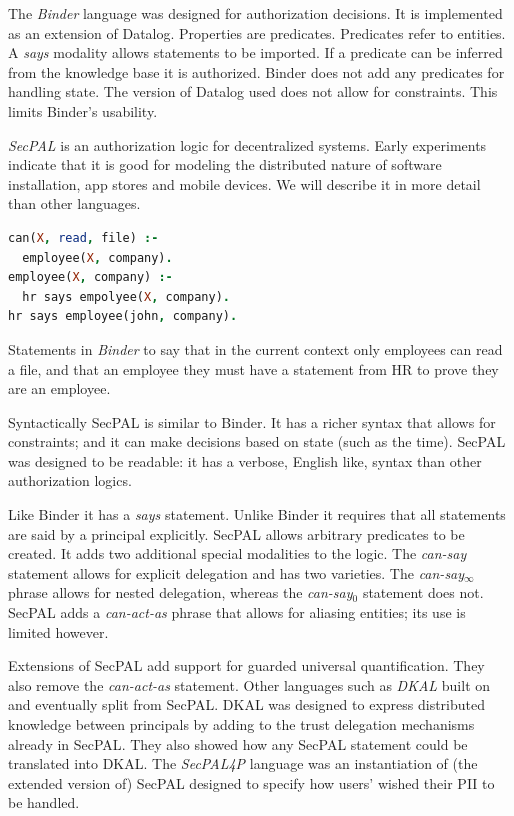 \documentclass[a4paper,sfsidenotes]{tufte-book}
\begin{document}
The \emph{Binder} language\cite{DeTreville:2002ff} was designed for
authorization decisions\cite{Abadi:2003kt}.  It is implemented as an extension
of Datalog.  Properties are predicates. Predicates refer to entities.  A
\emph{says} modality allows statements to be imported.  If a predicate can be
inferred from the knowledge base it is authorized.  Binder does not add any
predicates for handling state.  The version of Datalog used does not allow for
constraints.  This limits Binder's usability.


\emph{{SecPAL}}\cite{Becker:2006vh} is an authorization logic for decentralized
systems. Early experiments indicate that it is good  for modeling the
distributed nature of software installation, app stores and mobile devices. We
will describe it in more detail than other languages.

\begin{marginfigure}\label{code:binder}
  \begin{lstlisting}[language=Prolog,morekeywords={*,says,:-}]
can(X, read, file) :- 
  employee(X, company).
employee(X, company) :- 
  hr says empolyee(X, company).
hr says employee(john, company).
  \end{lstlisting}
  \caption{Statements in \emph{Binder} to say that in the current context only
    employees can read a file, and that an employee they must have a statement
    from HR to prove they are an employee.}
\end{marginfigure}

Syntactically {SecPAL} is similar to Binder. It has a richer syntax
that allows for constraints; and it can make decisions based on state (such as the
time). {SecPAL} was designed to be readable: it has a verbose, English like,
syntax than other authorization logics.

Like Binder it has a \emph{says} statement. Unlike Binder it requires that all
statements are said by a principal explicitly. {SecPAL} allows arbitrary
predicates to be created. It adds two additional special modalities to the
logic. The \emph{can-say} statement allows for explicit delegation and has two
varieties.  The \emph{can-say$_\infty$} phrase allows for nested delegation,
whereas the \emph{can-say$_0$} statement does not. {SecPAL} adds a
\emph{can-act-as} phrase that allows for aliasing entities; its use is limited
however.

Extensions of {SecPAL}\cite{Becker:2009vt} add support for guarded
universal quantification. They also remove the \emph{can-act-as} statement. Other
languages such as \emph{DKAL}\cite{Gurevich:2008fz} built on and eventually split
from {SecPAL}. DKAL was designed to express distributed knowledge between
principals by adding to the trust delegation mechanisms already in {SecPAL}.
They also showed how any {SecPAL} statement could be translated into {DKAL}.
The \emph{{SecPAL}4P} language\cite{Becker:2009ula} was an instantiation of (the
extended version of) {SecPAL} designed to specify how users' wished their
\ac{PII} to be handled.
\end{document}
